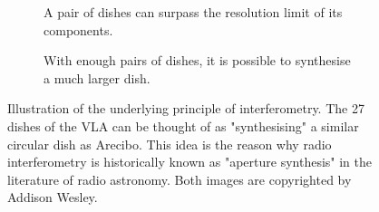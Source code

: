 \begin{figure}[h]
\centering
\begin{subfigure}{.43\textwidth}
\caption{\label{fig.baseline.image} A pair of dishes can surpass the resolution limit of its components.}
\end{subfigure}
\hfill
\begin{subfigure}{.43\textwidth}
\caption{\label{fig.arecibo.vla} With enough pairs of dishes, it is possible to synthesise a much larger dish.}
\end{subfigure}
\caption{\label{fig.aperture.synthesis} Illustration of the underlying principle of interferometry. The 27 dishes of the VLA can be thought of as "synthesising" a similar circular dish as Arecibo. This idea is the reason why radio interferometry is historically known as "aperture synthesis" in the literature of radio astronomy. Both images are copyrighted by Addison Wesley.}
\end{figure}

